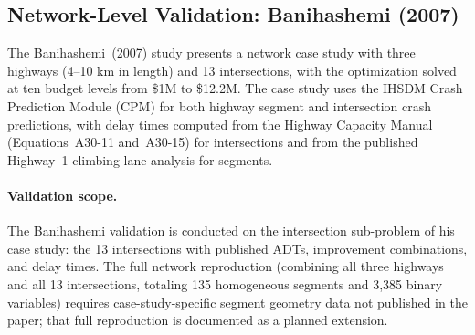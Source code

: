 \subsection{Network-Level Validation: Banihashemi (2007)}
\label{sec:validation-banihashemi}

The Banihashemi~(2007) study presents a network case study with three
highways (4--10 km in length) and 13 intersections, with the optimization
solved at ten budget levels from \$1M to \$12.2M. The case study uses the
IHSDM Crash Prediction Module (CPM) for both highway segment and
intersection crash predictions, with delay times computed from the Highway
Capacity Manual (Equations~A30-11 and~A30-15) for intersections and from
the published Highway~1 climbing-lane analysis for segments.

\paragraph{Validation scope.} The Banihashemi validation is conducted on the
intersection sub-problem of his case study: the 13 intersections with
published ADTs, improvement combinations, and delay times. The full network
reproduction (combining all three highways and all 13 intersections, totaling
135 homogeneous segments and 3{,}385 binary variables) requires
case-study-specific segment geometry data not published in the paper; that
full reproduction is documented as a planned extension.

